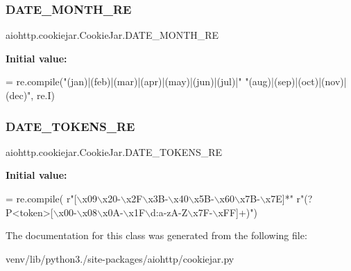 \subsubsection{\texorpdfstring{D\+A\+T\+E\+\_\+\+M\+O\+N\+T\+H\+\_\+\+RE}{DATE\_MONTH\_RE}}
{\footnotesize\ttfamily aiohttp.\+cookiejar.\+Cookie\+Jar.\+D\+A\+T\+E\+\_\+\+M\+O\+N\+T\+H\+\_\+\+RE\hspace{0.3cm}{\ttfamily [static]}}

{\bfseries Initial value\+:}
\begin{DoxyCode}
=  re.compile(\textcolor{stringliteral}{"(jan)|(feb)|(mar)|(apr)|(may)|(jun)|(jul)|"}
                               \textcolor{stringliteral}{"(aug)|(sep)|(oct)|(nov)|(dec)"}, re.I)
\end{DoxyCode}
\mbox{\label{classaiohttp_1_1cookiejar_1_1_cookie_jar_a20ae9b1a9572c659b5f79524bf15c718}} 
\subsubsection{\texorpdfstring{D\+A\+T\+E\+\_\+\+T\+O\+K\+E\+N\+S\+\_\+\+RE}{DATE\_TOKENS\_RE}}
{\footnotesize\ttfamily aiohttp.\+cookiejar.\+Cookie\+Jar.\+D\+A\+T\+E\+\_\+\+T\+O\+K\+E\+N\+S\+\_\+\+RE\hspace{0.3cm}{\ttfamily [static]}}

{\bfseries Initial value\+:}
\begin{DoxyCode}
=  re.compile(
        \textcolor{stringliteral}{r"[\(\backslash\)x09\(\backslash\)x20-\(\backslash\)x2F\(\backslash\)x3B-\(\backslash\)x40\(\backslash\)x5B-\(\backslash\)x60\(\backslash\)x7B-\(\backslash\)x7E]*"}
        \textcolor{stringliteral}{r"(?P<token>[\(\backslash\)x00-\(\backslash\)x08\(\backslash\)x0A-\(\backslash\)x1F\(\backslash\)d:a-zA-Z\(\backslash\)x7F-\(\backslash\)xFF]+)"})
\end{DoxyCode}


The documentation for this class was generated from the following file\+:\begin{DoxyCompactItemize}
\item 
venv/lib/python3./site-\/packages/aiohttp/cookiejar.\+py\end{DoxyCompactItemize}
